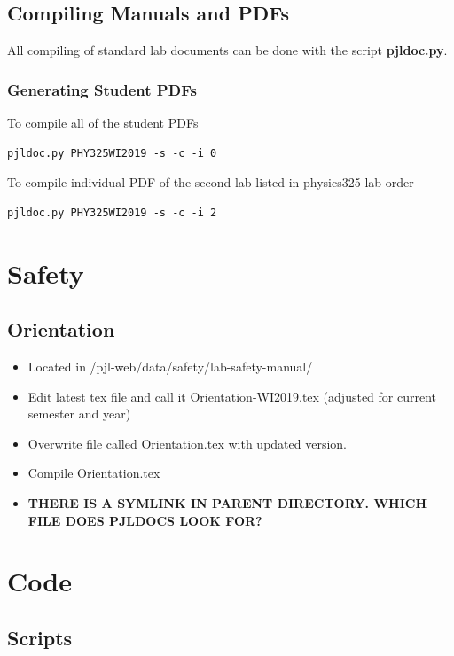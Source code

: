 \documentclass[justified]{book}
\begin{document}
\section{Compiling Manuals and PDFs}

All compiling of standard lab documents can be done with the script {\bf pjldoc.py}.

\subsection{Generating Student PDFs}

To compile all of the student PDFs

\begin{lstlisting}
pjldoc.py PHY325WI2019 -s -c -i 0        
\end{lstlisting}


To compile individual PDF of the second lab listed in physics325-lab-order

\begin{lstlisting}
pjldoc.py PHY325WI2019 -s -c -i 2
\end{lstlisting}

\chapter{Safety}

\section{Orientation}
\begin{itemize}
\item Located in /pjl-web/data/safety/lab-safety-manual/
\item Edit latest tex file and call it Orientation-WI2019.tex (adjusted for current semester and year)
\item Overwrite file called Orientation.tex with updated version. 
\item Compile Orientation.tex
\item {\bf THERE IS A SYMLINK IN PARENT DIRECTORY. WHICH FILE DOES PJLDOCS LOOK FOR?}
\end{itemize}

\chapter{Code}

\section{Scripts}
\end{document}

